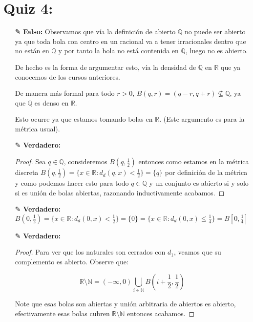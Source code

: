 \section{Quiz 4:}

\begin{itemize}
\item[✎] \textbf{Falso: }Observamos que vía la definición de abierto $\mathbb{Q}$ no puede ser abierto ya que toda bola con centro en un racional va a tener irracionales dentro que no están en $\mathbb{Q}$ y por tanto la bola no está contenida en $\mathbb{Q}$, luego no es abierto.

De hecho es la forma de argumentar esto, vía la densidad de $\mathbb{Q}$ en $\mathbb{R}$ que ya conocemos de los cursos anteriores.

De manera más formal para todo $r>0$, $B(q,r)=(q-r,q+r) \not \subseteq \mathbb{Q}$, ya que $\mathbb{Q}$ es denso en $\mathbb{R}$.

Esto ocurre ya que estamos tomando bolas en $\mathbb{R}$. (Este argumento es para la métrica usual).

\item[✎] \textbf{Verdadero: } \\
\begin{proof}
    Sea $q \in \mathbb{Q}$, consideremos $B(q,\frac{1}{2})$ entonces como estamos en la métrica discreta $B(q,\frac{1}{2})=\{x\in \mathbb{R}:d_d(q,x)<\frac{1}{2}\}=\{q\}$ por definición de la métrica y como podemos hacer esto para todo $q\in \mathbb{Q}$ y un conjunto es abierto si y solo si es unión de bolas abiertas, razonando inductivamente acabamos.
\end{proof}


\item[✎] \textbf{Verdadero: }$B(0,\frac{1}{2})=\{x\in \mathbb{R} : d_d(0,x)<\frac{1}{2}\}=\{0\}=\{x \in \mathbb{R} : d_d(0,x)\leq \frac{1}{4}\}=B[0,\frac{1}{4}]$

\item[✎]\textbf{Verdadero: }\\
\begin{proof}
    Para ver que los naturales son cerrados con $d_1$, veamos que su complemento es abierto. Observe que:


    $$\displaystyle \mathbb{R}\setminus\mathbb{N}=(-\infty,0)\bigcup_{i \in \mathbb{N}}B\left(i+\frac{1}{2},\frac{1}{2}\right)$$


Note que esas bolas son abiertas y unión arbitraria de abiertos es abierto, efectivamente esas bolas cubren $\mathbb{R}\setminus \mathbb{N}$ entonces acabamos.
    

\end{proof}
\end{itemize}
